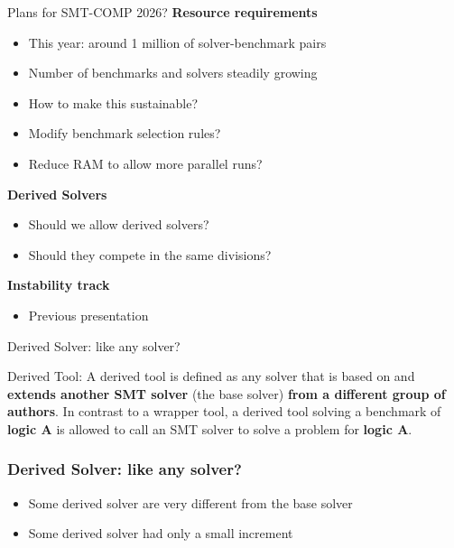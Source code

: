 \documentclass[table]{beamer}
\begin{document}
\begin{frame}{Plans for SMT-COMP 2026?}
  \textbf{Resource requirements}
  \begin{itemize}
  \item This year: around 1 million of solver-benchmark pairs
  \item Number of benchmarks and solvers steadily growing
  \item How to make this sustainable?
  \item Modify benchmark selection rules?
  \item Reduce RAM to allow more parallel runs?
  \end{itemize}

  \bigskip
  \textbf{Derived Solvers}
  \begin{itemize}
  \item Should we allow derived solvers?
  \item Should they compete in the same divisions?
  \end{itemize}

  \bigskip

  \textbf{Instability track}
  \begin{itemize}
  \item Previous presentation \smiley
  \end{itemize}
\end{frame}



\begin{frame}{Derived Solver: like any solver?}

  Derived Tool: A derived tool is defined as any solver that is based on and \textbf{extends another SMT
solver} (the base solver) \textbf{from a different group of authors}. In contrast to a wrapper tool, a derived
tool solving a benchmark of \textbf{logic A} is allowed to call an SMT solver to solve a problem for \textbf{logic
A}.
\end{frame}

\begin{frame}
\frametitle{Derived Solver: like any solver?}
\begin{itemize}
  \item Some derived solver are very different from the base solver
  \item Some derived solver had only a small increment
\end{itemize}
\end{frame}
\end{document}
